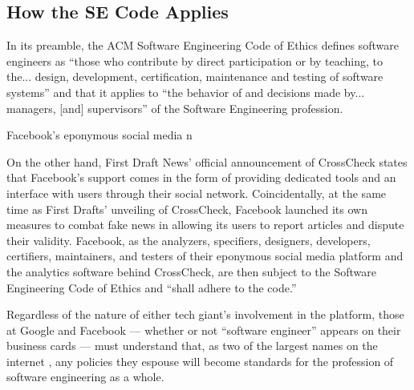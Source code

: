 

\subsection{How the SE Code Applies}

\par In its preamble, the ACM Software Engineering Code of Ethics defines software engineers as ``those who contribute by direct participation or by teaching, to the... design, development, certification, maintenance and testing of software systems'' and that it applies to ``the behavior of and decisions made by... managers, [and] supervisors'' of the Software Engineering profession. \cite{se_code}

%
%


\par Facebook's eponymous social media n


\par On the other hand, First Draft News' official announcement of CrossCheck states that Facebook's support comes in the form of providing dedicated tools and an interface with users through their social network. \cite{crosscheck_launch} Coincidentally, at the same time as First Drafts' unveiling of CrossCheck, Facebook launched its own measures to combat fake news in allowing its users to report articles and dispute their validity. \cite{tc_google_fb_partner} Facebook, as the analyzers, specifiers, designers, developers, certifiers, maintainers, and testers of their eponymous social media platform and the analytics software behind CrossCheck, are then subject to the Software Engineering Code of Ethics and ``shall adhere to the code.'' \cite{se_code}

\par Regardless of the nature of either tech giant's involvement in the platform, those at Google and Facebook --- whether or not ``software engineer'' appears on their business cards --- must understand that, as two of the largest names on the internet , any policies they espouse will become standards for the profession of software engineering as a whole.


